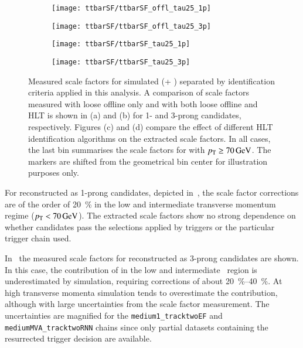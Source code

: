 \begin{figure}[htbp]
  \centering

  \begin{subfigure}[t]{.495\textwidth}
    \texttt{[image: ttbarSF/ttbarSF\_offl\_tau25\_1p]}
    \caption{}
    \label{fig:ttbarSF_postfit_SF_a}
  \end{subfigure}\hfill%
  \begin{subfigure}[t]{.495\textwidth}
    \texttt{[image: ttbarSF/ttbarSF\_offl\_tau25\_3p]}
    \caption{}
    \label{fig:ttbarSF_postfit_SF_b}
  \end{subfigure}

  \begin{subfigure}[t]{.495\textwidth}
    \texttt{[image: ttbarSF/ttbarSF\_tau25\_1p]}
    \caption{}
    \label{fig:ttbarSF_postfit_SF_c}
  \end{subfigure}\hfill%
  \begin{subfigure}[t]{.495\textwidth}
    \texttt{[image: ttbarSF/ttbarSF\_tau25\_3p]}
    \caption{}
    \label{fig:ttbarSF_postfit_SF_d}
  \end{subfigure}

  \caption{Measured \faketauhadvis scale factors for simulated \ttbar
    (\POWHEGBOX[v2] + \PYTHIA[8]) separated by \tauhadvis
    identification criteria applied in this analysis. A comparison of
    \faketauhadvis scale factors measured with loose offline \tauid
    only and with both loose offline and HLT \tauid is shown in (a)
    and (b) for 1- and 3-prong \tauhadvis candidates, respectively.
    Figures (c) and (d) compare the effect of different HLT
    identification algorithms on the extracted scale factors. In all
    cases, the last bin summarises the scale factors for \tauhadvis
    with $\pT \geq \SI{70}{\GeV}$.  The markers are shifted from the
    geometrical bin center for illustration purposes only.}%
  \label{fig:ttbarSF_postfit_SF}
\end{figure}

For \faketauhadvis reconstructed as 1-prong \tauhadvis candidates,
depicted in~,
the scale factor corrections are of the order of \SI{20}{\percent} in
the low and intermediate transverse momentum regime
($\pT < \SI{70}{\GeV}$). The extracted scale factors show no strong
dependence on whether candidates pass the selections applied by
\tauhadvis triggers or the particular trigger chain used.

In~ the
measured scale factors for \faketauhadvis reconstructed as 3-prong
candidates are shown. In this case, the contribution of \faketauhadvis
in the low and intermediate \tauhadvis~\pT region is underestimated by
simulation, requiring corrections of about
\SIrange{20}{40}{\percent}. At high transverse momenta simulation
tends to overestimate the \faketauhadvis contribution, although with
large uncertainties from the scale factor measurement. The
uncertainties are magnified for the \texttt{medium1\_tracktwoEF} and
\texttt{mediumMVA\_tracktwoRNN} chains since only partial datasets
containing the resurrected trigger decision are available.

